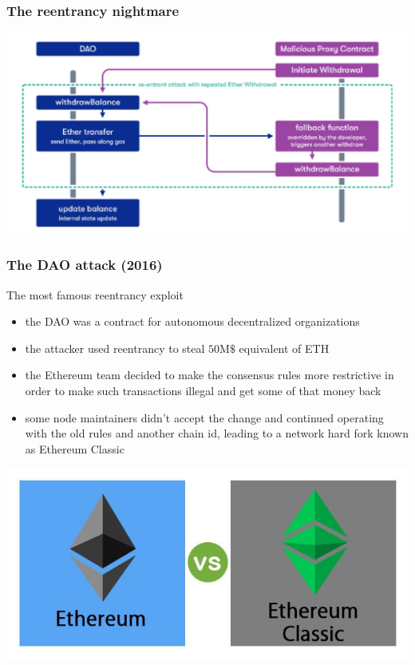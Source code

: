 \documentclass[11pt]{beamer}  %
\begin{document}
\begin{frame}\frametitle{The reentrancy nightmare}

  \begin{center}
    \includegraphics[width=\textwidth,clip=false]{pictures/re-entrancy.png}
  \end{center}

\end{frame}

\begin{frame}\frametitle{The DAO attack (2016)}

  \begin{greenbox}{The most famous reentrancy exploit}
    \begin{itemize}
    \item the DAO was a contract for autonomous decentralized organizations
    \item the attacker used reentrancy to steal $50\text{M}\$$ equivalent of ETH
    \item the Ethereum team decided to make the consensus rules more restrictive in order
      to make such transactions illegal and get some of that money back
    \item some node maintainers didn't accept the change and continued
      operating with the old rules and another chain id, leading to a network hard fork known as
      Ethereum Classic
    \end{itemize}
  \end{greenbox}

  \begin{center}
    \includegraphics[scale=0.5,clip=false]{pictures/ethereum-vs-ethereum-classic.jpg}
  \end{center}

\end{frame}
\end{document}
